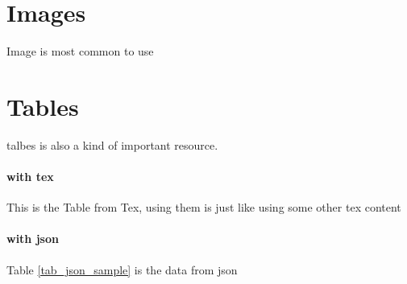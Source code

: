 \documentclass{article}
\begin{document}
\section{Images}
Image is most common to use

\section{Tables}
talbes is also a kind of important resource.

\paragraph{with tex}
This is the Table from Tex, using them is just like using some other tex content
\begin{table}[h!]

\end{table}
\paragraph{with json}
Table \ref{tab_json_sample} is the data from json
\begin{table}[h!]

\end{table}
\end{document}
